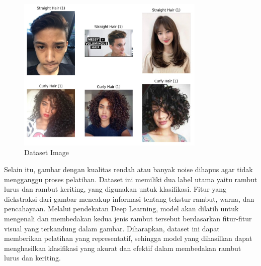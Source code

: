 \documentclass[12pt,a4paper]{article}
\begin{document}
\begin{figure}[h]  
    \centering  
    \includegraphics[width=0.8\textwidth]{images/eda2.jpeg}  
    \caption{Dataset Image}  
    \label{fig:gambar}  
\end{figure}

Selain itu, gambar dengan kualitas rendah atau banyak noise dihapus agar tidak mengganggu proses pelatihan. Dataset ini memiliki dua label utama yaitu rambut lurus dan rambut keriting, yang digunakan untuk klasifikasi. Fitur yang diekstraksi dari gambar mencakup informasi tentang tekstur rambut, warna, dan pencahayaan. Melalui pendekatan Deep Learning, model akan dilatih untuk mengenali dan membedakan kedua jenis rambut tersebut berdasarkan fitur-fitur visual yang terkandung dalam gambar. Diharapkan, dataset ini dapat memberikan pelatihan yang representatif, sehingga model yang dihasilkan dapat menghasilkan klasifikasi yang akurat dan efektif dalam membedakan rambut lurus dan keriting.

\end{document}
